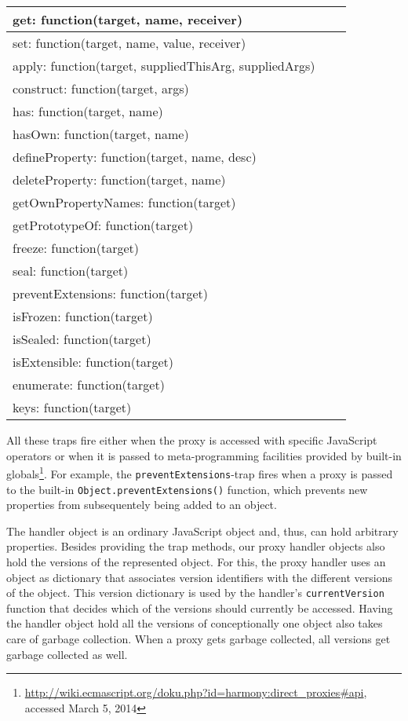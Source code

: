 \begin{table}[h]
\begin{tabular}{|l|l|r|}
\hline
get: function(target, name, receiver) \\ \hline
set: function(target, name, value, receiver) \\ \hline
apply: function(target, suppliedThisArg, suppliedArgs) \\ \hline
construct: function(target, args) \\ \hline
has: function(target, name) \\ \hline
hasOwn: function(target, name) \\ \hline
defineProperty: function(target, name, desc) \\ \hline
deleteProperty: function(target, name) \\ \hline
getOwnPropertyNames: function(target) \\ \hline
getPrototypeOf: function(target) \\ \hline
freeze: function(target) \\ \hline
seal: function(target) \\ \hline
preventExtensions: function(target) \\ \hline
isFrozen: function(target) \\ \hline
isSealed: function(target) \\ \hline
isExtensible: function(target) \\ \hline
enumerate: function(target) \\ \hline
keys: function(target) \\ \hline
\end{tabular}
\end{table}

All these traps fire either when the proxy is accessed with specific JavaScript operators or when it is passed to meta-programming facilities provided by built-in globals\footnote{\url{http://wiki.ecmascript.org/doku.php?id=harmony:direct_proxies\#api}, accessed March 5, 2014}.
For example, the \lstinline{preventExtensions}-trap fires when a proxy is passed to the built-in \lstinline{Object.preventExtensions()} function, which prevents new properties from subsequentely being added to an object.

The handler object is an ordinary JavaScript object and, thus, can hold arbitrary properties.
Besides providing the trap methods, our proxy handler objects also hold the versions of the represented object.
For this, the proxy handler uses an object as dictionary that associates version identifiers with the different versions of the object.
This version dictionary is used by the handler's \lstinline{currentVersion} function that decides which of the versions should currently be accessed.
Having the handler object hold all the versions of conceptionally one object also takes care of garbage collection.
When a proxy gets garbage collected, all versions get garbage collected as well.




